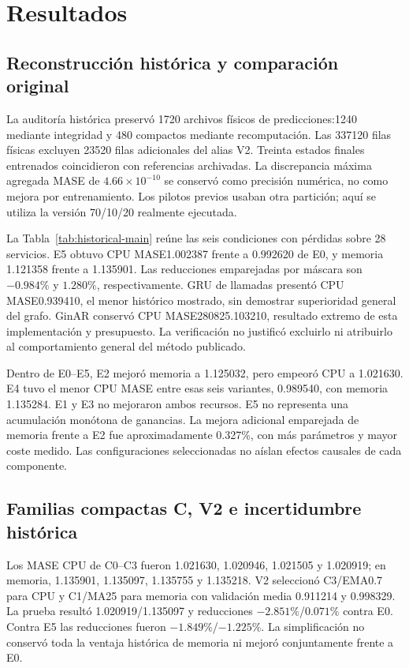 \section{Resultados}
\subsection{Reconstrucción histórica y comparación original}\label{sec:historical-loss}
La auditoría histórica preservó 1720 archivos físicos de predicciones:1240 mediante integridad y 480 compactos mediante recomputación. Las 337120 filas físicas excluyen 23520 filas adicionales del alias V2. Treinta estados finales entrenados coincidieron con referencias archivadas. La discrepancia máxima agregada MASE de $4.66\times 10^{-10}$ se conservó como precisión numérica, no como mejora por entrenamiento. Los pilotos previos usaban otra partición; aquí se utiliza la versión 70/10/20 realmente ejecutada.

La Tabla~\ref{tab:historical-main} reúne las seis condiciones con pérdidas sobre 28 servicios. E5 obtuvo CPU MASE1.002387 frente a 0.992620 de E0, y memoria 1.121358 frente a 1.135901. Las reducciones emparejadas por máscara son $-0.984\%$ y $1.280\%$, respectivamente. GRU de llamadas presentó CPU MASE0.939410, el menor histórico mostrado, sin demostrar superioridad general del grafo. GinAR conservó CPU MASE280825.103210, resultado extremo de esta implementación y presupuesto. La verificación no justificó excluirlo ni atribuirlo al comportamiento general del método publicado.
\begin{table}[!t]
\caption{Promedios históricos de seis condiciones con pérdidas, 28 servicios, tres semillas neuronales y veinte máscaras. Los errores absolutos CPU conservan escala publicada; memoria se expresa en bytes. V2 es un alias seleccionado.}\label{tab:historical-main}
\centering\footnotesize
\FitTable{}
\end{table}

Dentro de E0--E5, E2 mejoró memoria a 1.125032, pero empeoró CPU a 1.021630. E4 tuvo el menor CPU MASE entre esas seis variantes, 0.989540, con memoria 1.135284. E1 y E3 no mejoraron ambos recursos. E5 no representa una acumulación monótona de ganancias. La mejora adicional emparejada de memoria frente a E2 fue aproximadamente 0.327\%, con más parámetros y mayor coste medido. Las configuraciones seleccionadas no aíslan efectos causales de cada componente.

\subsection{Familias compactas C, V2 e incertidumbre histórica}\label{sec:historical-compact}
Los MASE CPU de C0--C3 fueron 1.021630, 1.020946, 1.021505 y 1.020919; en memoria, 1.135901, 1.135097, 1.135755 y 1.135218. V2 seleccionó C3/EMA0.7 para CPU y C1/MA25 para memoria con validación media 0.911214 y 0.998329. La prueba resultó 1.020919/1.135097 y reducciones $-2.851\%$/$0.071\%$ contra E0. Contra E5 las reducciones fueron $-1.849\%$/$-1.225\%$. La simplificación no conservó toda la ventaja histórica de memoria ni mejoró conjuntamente frente a E0.

